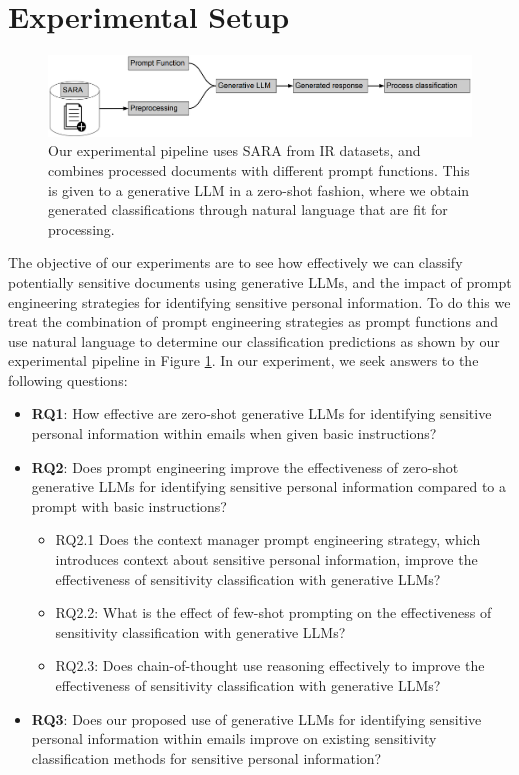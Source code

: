 \section{Experimental Setup}
\begin{figure}[!h]
\begin{center}
\includegraphics[scale=0.23]{figures/pipeline.pdf}
\end{center}
\caption{\label{fig-pipeline}Our experimental pipeline uses SARA from IR datasets, and combines processed documents with different prompt functions. This is given to a generative LLM in a zero-shot fashion, where we obtain generated classifications through natural language that are fit for processing.}
\end{figure}

The objective of our experiments are to see how effectively we can classify potentially sensitive documents using generative LLMs, and the impact of prompt engineering strategies for identifying sensitive personal information. To do this we treat the combination of prompt engineering strategies as prompt functions and use natural language to determine our classification predictions as shown by our experimental pipeline in Figure \ref{fig-pipeline}. In our experiment, we seek answers to the following questions:
\begin{itemize}
    \item \textbf{RQ1}: How effective are zero-shot generative LLMs for identifying sensitive personal information within emails when given basic instructions?
    \item \textbf{RQ2}: Does prompt engineering improve the effectiveness of zero-shot generative LLMs for identifying sensitive personal information compared to a prompt with basic instructions?
    \begin{itemize}
    \item RQ2.1 Does the context manager prompt engineering strategy, which introduces context about sensitive personal information, improve the effectiveness of sensitivity classification with generative LLMs?
    \item RQ2.2: What is the effect of few-shot prompting on the effectiveness of sensitivity classification with generative LLMs?
    \item RQ2.3: Does chain-of-thought use reasoning effectively to improve the effectiveness of sensitivity classification with generative LLMs?
    \end{itemize}
    \item \textbf{RQ3}: Does our proposed use of generative LLMs for identifying sensitive personal information within emails improve on existing sensitivity classification methods for sensitive personal information?
\end{itemize}

